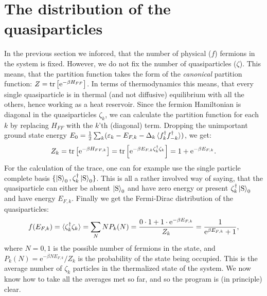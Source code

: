 \section{The distribution of the quasiparticles}
In the previous section we inforced, that the number of physical ($f$) fermions in the system is fixed. However, we do not fix the number of quasiparticles ($\zeta$). This means, that the partition function takes the form of the \textit{canonical} partition function: $Z = \operatorname{tr}\left[\text{e}^{-\beta H_{FF}}\right]$. In terms of thermodynamics this means, that every single quasiparticle is in thermal (and not diffusive) equilibrium with all the others, hence working as a heat reservoir. Since the fermion Hamiltonian is diagonal in the quasiparticles $\zeta_k$, we can calculate the partition function for each $k$ by replacing $H_{FF}$ with the $k$'th (diagonal) term. Dropping the unimportant ground state energy $E_0 = \frac{1}{2}\sum_k (\varepsilon_k - E_{F,k} - \Delta_k\braket {f^\dagger_k f^\dagger_{-k}})$, we get:
\begin{equation}
Z_k = \operatorname{tr}\left[\text{e}^{-\beta H_{FF,k}}\right] = \operatorname{tr}\left[\text{e}^{-\beta E_{F,k}\zeta^\dagger_k\zeta_k }\right] = 1 + \text{e}^{-\beta E_{F,k}}. 
\end{equation}     
For the calculation of the trace, one can for example use the single particle complete basis $\{\ket{\text{S}}_0, \zeta^\dagger_k\ket{\text{S}}_0\}$. This is all a rather involved way of saying, that the quasiparticle can either be absent $\ket{\text{S}}_0$ and have zero energy or present $\zeta^\dagger_k\ket{\text{S}}_0$ and have energy $E_{F,k}$. Finally we get the Fermi-Dirac distribution of the quasiparticles:
\begin{equation}
f(E_{F,k}) = \braket {\zeta^\dagger_k\zeta_k} = \sum_N N P_k(N) = \frac{0\cdot 1 + 1 \cdot \text{e}^{-\beta E_{F,k}} }{Z_k} = \frac{1}{\text{e}^{\beta E_{F,k}} + 1}, 
\end{equation}
where $N=0,1$ is the possible number of fermions in the state, and $P_k(N) = \text{e}^{-\beta N E_{F,k}}/Z_k$ is the probability of the state being occupied\cite{PlischkeStatPhys,SchroederThermal}. This is the average number of $\zeta_k$ particles in the thermalized state of the system. We now know how to take all the averages met so far, and so the program is (in principle) clear. 

